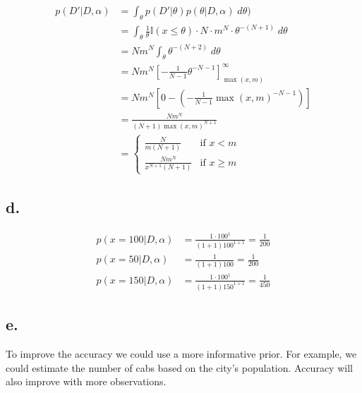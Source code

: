 \documentclass{article}
\begin{document}
\begin{align*}
  p(D'|D,\alpha) &= \int_\theta p(D'|\theta) p(\theta|D,\alpha) \;
                   d\theta) \\
                 &= \int_\theta \frac{1}{\theta} \mathbb{I}(x \le
                   \theta) \cdot N \cdot m^N \cdot \theta^{-(N+1)} \;
                   d\theta \\
                 &= Nm^N \int_\theta \theta^{-(N+2)} \; d\theta \\
                 &= Nm^N \left[ -\frac{1}{N-1} \theta^{-N-1}
                   \right]_{\max(x,m)}^\infty \\
                 &= Nm^N \left[ 0 - \left( -\frac{1}{N-1}
                   \max(x,m)^{-N-1} \right) \right] \\
                 &= \frac{Nm^N}{(N+1)\max(x,m)^{N+1}} \\
                 &= \left\{ \begin{array}{ll}
                              \frac{N}{m(N+1)} & \mbox{if $x < m$} \\
                              \frac{Nm^N}{x^{N+1}(N+1)} & \mbox{if $x
                                                          \ge m$}
                            \end{array} \right.
\end{align*}

\subsection{d.}

\begin{equation*}
  \begin{split}
    p(x = 100|D,\alpha) &= \frac{1 \cdot 100^1}{(1+1)100^{1+1}} =
    \frac{1}{200} \\
    p(x = 50|D,\alpha) &= \frac{1}{(1+1)100} = \frac{1}{200} \\
    p(x = 150|D,\alpha) &= \frac{1 \cdot 100^1}{(1+1)150^{1+1}} =
    \frac{1}{450}
  \end{split}
\end{equation*}

\subsection{e.}
To improve the accuracy we could use a more informative prior. For
example, we could estimate the number of cabs based on the city's
population. Accuracy will also improve with more observations.
\end{document}
